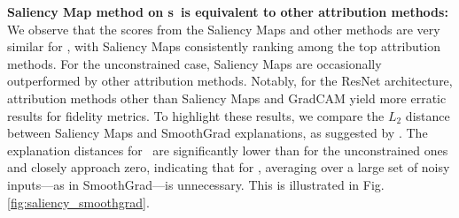 \textbf{Saliency Map method on \otnn s~is equivalent to other attribution methods: }
We observe that the scores from the Saliency Maps and other methods are very similar for \otnn, with Saliency Maps consistently ranking among the top attribution methods. For the unconstrained case, Saliency Maps are occasionally outperformed by other attribution methods. Notably, for the ResNet architecture, attribution methods other than Saliency Maps and GradCAM yield more erratic results for fidelity metrics. To highlight these results, we compare the $L_2$ distance between Saliency Maps and SmoothGrad explanations, as suggested by \cite{Adebayo18Sanity,felHowGood22,tomsett2019sanity,ghorbani2017interpretation}. The explanation distances for \otnn~are significantly lower than for the unconstrained ones and closely approach zero, indicating that for \otnn, averaging over a large set of noisy inputs—as in SmoothGrad—is unnecessary. This is illustrated in Fig.\ref{fig:saliency_smoothgrad}.
\iftrue

